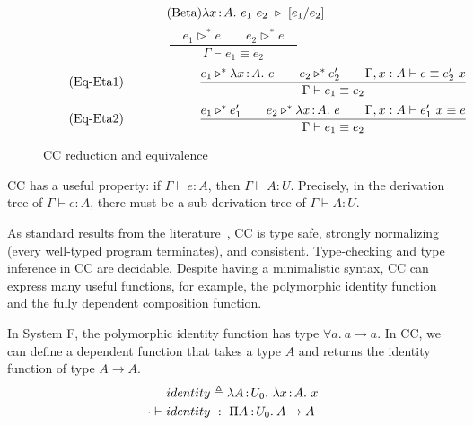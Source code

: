 \begin{figure}
	\begin{equation*}
		\tag{Beta}
		\lambda x\hspace{0.5mm}{:}\hspace{0.5mm} A.\ e_1 \ e_2 \ \triangleright \ [e_1\slash e_2]
	\end{equation*}
	\begin{equation}
		\tag{Eq-eq}
		\frac
			{\quad e_1 \triangleright^* e \qquad e_ 2\triangleright^* e \quad}
			{\Gamma \vdash e_1 \equiv e_2}
	\end{equation}
	\begin{equation}
		\tag{Eq-Eta1}
		\qquad\qquad\qquad
		\frac
			{e_1 \triangleright^* \lambda x\hspace{0.5mm}{:}\hspace{0.5mm} A.\ e \qquad
			 e_2 \triangleright^* e_2' \qquad
			 \Gamma, x : A \vdash e \equiv e_2'\ x}
			{\Gamma \vdash e_1 \equiv e_2}
	\end{equation}
	\begin{equation}
		\tag{Eq-Eta2}
		\qquad\qquad\qquad
		\frac
			{ e_1 \triangleright^* e_1' \qquad
			 e_2 \triangleright^* \lambda x\hspace{0.5mm}{:}\hspace{0.5mm} A.\ e \qquad
			 \Gamma, x : A \vdash e_1'\ x \equiv e }
			{\Gamma \vdash e_1 \equiv e_2}
	\end{equation}
	\caption{CC reduction and equivalence}
    \label{fig:cc equivalence}
\end{figure}



CC has a useful property: if $\Gamma \vdash e : A$, then $\Gamma \vdash A : U$. Precisely, in the derivation tree of $\Gamma \vdash e : A$, there must be a sub-derivation tree of $\Gamma \vdash A : U$.

As standard results from the literature~\cite{DBLP:journals/iandc/CoquandH88,DBLP:phd/ethos/Luo90}, CC is type safe, strongly normalizing (every well-typed program terminates), and consistent. Type-checking and type inference in CC are decidable. Despite having a minimalistic syntax, CC can express many useful functions, for example, the polymorphic identity function and the fully dependent composition function.

\begin{exmp}
In System F, the polymorphic identity function has type $\forall a.\ a \rightarrow a$. In CC, we can define a  dependent function that takes a type $A$ and returns the identity function of type $A \rightarrow A$.
	\begin{align*}
		&identity \triangleq \lambda A\hspace{0.5mm}{:}\hspace{0.5mm} U_0.\ \lambda x\hspace{0.5mm}{:}\hspace{0.5mm} A.\ x \\
		\cdot \vdash\ &identity\ :\ \Pi A\mkern1.5mu{\hspace{0.5mm}{:}\hspace{0.5mm}} U_0.\hspace{0.8mm}A \rightarrow A
	\end{align*}
\end{exmp}

